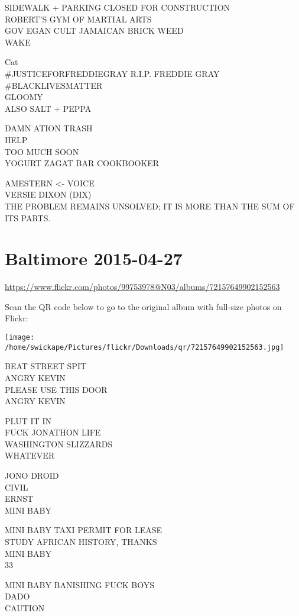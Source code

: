\documentclass[10pt,letterpaper]{article}
\begin{document}
SIDEWALK + PARKING CLOSED FOR CONSTRUCTION\\
ROBERT'S GYM OF MARTIAL ARTS\\
GOV EGAN CULT JAMAICAN BRICK WEED\\
WAKE

Cat\\
\#JUSTICEFORFREDDIEGRAY R.I.P. FREDDIE GRAY \#BLACKLIVESMATTER\\
GLOOMY\\
ALSO SALT + PEPPA

DAMN ATION TRASH\\
HELP\\
TOO MUCH SOON\\
YOGURT ZAGAT BAR COOKBOOKER

AMESTERN <{-} VOICE\\
VERSIE DIXON (DIX)\\
THE PROBLEM REMAINS UNSOLVED; IT IS MORE THAN THE SUM OF ITS PARTS.


\section*{Baltimore 2015-04-27}

\url{https://www.flickr.com/photos/99753978@N03/albums/72157649902152563}

Scan the QR code below to go to the original album with full-size photos on Flickr:

\texttt{[image: /home/swickape/Pictures/flickr/Downloads/qr/72157649902152563.jpg]}


BEAT STREET SPIT\\
ANGRY KEVIN\\
PLEASE USE THIS DOOR\\
ANGRY KEVIN

PLUT IT IN\\
FUCK JONATHON LIFE\\
WASHINGTON SLIZZARDS\\
WHATEVER

JONO DROID\\
CIVIL\\
ERNST\\
MINI BABY

MINI BABY TAXI PERMIT FOR LEASE\\
STUDY AFRICAN HISTORY, THANKS\\
MINI BABY\\
33

MINI BABY BANISHING FUCK BOYS\\
DADO\\
CAUTION
\end{document}

